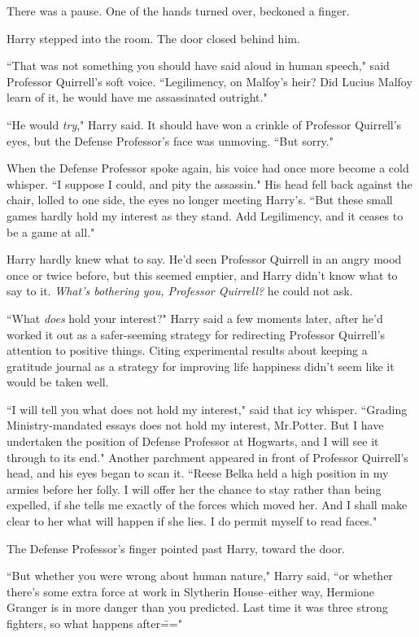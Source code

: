There was a pause. One of the hands turned over, beckoned a finger.

Harry stepped into the room. The door closed behind him.

``That was not something you should have said aloud in human speech," said Professor Quirrell's soft voice. ``Legilimency, on Malfoy's heir? Did Lucius Malfoy learn of it, he would have me assassinated outright."

``He would \emph{try}," Harry said. It should have won a crinkle of Professor Quirrell's eyes, but the Defense Professor's face was unmoving. ``But sorry."

When the Defense Professor spoke again, his voice had once more become a cold whisper. ``I suppose I could, and pity the assassin." His head fell back against the chair, lolled to one side, the eyes no longer meeting Harry's. ``But these small games hardly hold my interest as they stand. Add Legilimency, and it ceases to be a game at all."

Harry hardly knew what to say. He'd seen Professor Quirrell in an angry mood once or twice before, but this seemed emptier, and Harry didn't know what to say to it. \emph{What's bothering you, Professor Quirrell?} he could not ask.

``What \emph{does} hold your interest?" Harry said a few moments later, after he'd worked it out as a safer-seeming strategy for redirecting Professor Quirrell's attention to positive things. Citing experimental results about keeping a gratitude journal as a strategy for improving life happiness didn't seem like it would be taken well.

``I will tell you what does not hold my interest," said that icy whisper. ``Grading Ministry-mandated essays does not hold my interest, Mr.\?Potter. But I have undertaken the position of Defense Professor at Hogwarts, and I will see it through to its end." Another parchment appeared in front of Professor Quirrell's head, and his eyes began to scan it. ``Reese Belka held a high position in my armies before her folly. I will offer her the chance to stay rather than being expelled, if she tells me exactly of the forces which moved her. And I shall make clear to her what will happen if she lies. I do permit myself to read faces."

The Defense Professor's finger pointed past Harry, toward the door.

``But whether you were wrong about human nature," Harry said, ``or whether there's some extra force at work in Slytherin House\---either way, Hermione Granger is in more danger than you predicted. Last time it was three strong fighters, so what happens after\==="

